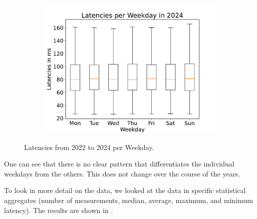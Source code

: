 \begin{figure}
\begin{subfigure}[b]{0.32\linewidth}
		\includegraphics[width=\linewidth]{chapters/4-results/latency/img/latency_2024_weekdays.pdf}
	\end{subfigure}
	\caption{Latencies from 2022 to 2024 per Weekday.}
	\label{fig:latencies-per-weekday}
\end{figure}

One can see that there is no clear pattern that differentiates the individual
weekdays from the others. This does not change over the course of the years.

To look in more detail on the data, we looked at the data in specific
statistical aggregates (number of measurements, median, average, maximum, and
minimum latency). The results are shown in .

